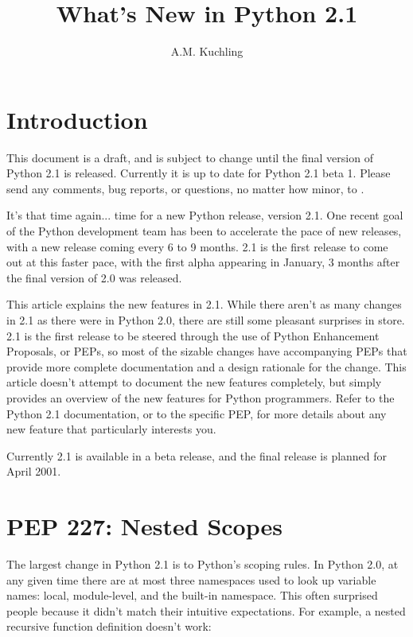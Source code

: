 \documentclass{howto}
\title{What's New in Python 2.1}
\author{A.M. Kuchling}
\begin{document}
\maketitle\tableofcontents

\section{Introduction}

{\large This document is a draft, and is subject to change until
the final version of Python 2.1 is released.  Currently it is up to date
for Python 2.1 beta 1.  Please send any comments, bug reports, or
questions, no matter how minor, to .  }

It's that time again... time for a new Python release, version 2.1.
One recent goal of the Python development team has been to accelerate
the pace of new releases, with a new release coming every 6 to 9
months. 2.1 is the first release to come out at this faster pace, with
the first alpha appearing in January, 3 months after the final version
of 2.0 was released.

This article explains the new features in 2.1.  While there aren't as
many changes in 2.1 as there were in Python 2.0, there are still some
pleasant surprises in store.  2.1 is the first release to be steered
through the use of Python Enhancement Proposals, or PEPs, so most of
the sizable changes have accompanying PEPs that provide more complete
documentation and a design rationale for the change.  This article
doesn't attempt to document the new features completely, but simply
provides an overview of the new features for Python programmers.
Refer to the Python 2.1 documentation, or to the specific PEP, for
more details about any new feature that particularly interests you.

Currently 2.1 is available in a beta release, and the final release is
planned for April 2001.

\section{PEP 227: Nested Scopes}

The largest change in Python 2.1 is to Python's scoping rules.  In
Python 2.0, at any given time there are at most three namespaces used
to look up variable names: local, module-level, and the built-in
namespace.  This often surprised people because it didn't match their
intuitive expectations.  For example, a nested recursive function
definition doesn't work:
\end{document}
